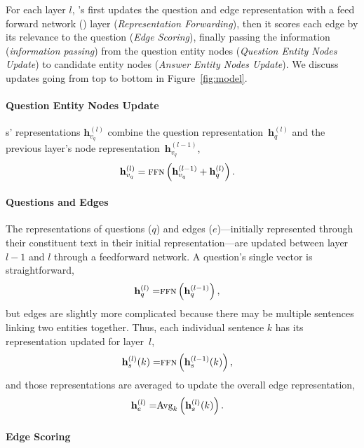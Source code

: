 For each layer $l$, \name{}'s  first updates the question and
edge representation with a feed forward network () layer
(\textit{Representation Forwarding}), then it scores each edge by its
relevance to the question (\textit{Edge Scoring}), finally passing the
information (\textit{information passing}) from the question entity
nodes (\textit{Question Entity Nodes Update}) to candidate entity
nodes (\textit{Answer Entity Nodes Update}).
%
We discuss updates going from top to bottom in Figure~\ref{fig:model}.

\paragraph{Question Entity Nodes Update}

\leftnode{}s' representations $\mathbf{h}_{v_q}^{(l)}$ combine the question representation~$\mathbf{h}_q^{(l)}$ and the previous layer's
node representation~$\mathbf{h}_{v_q}^{(l-1)}$, 
\begin{align}
\mathbf{h}_{v_q}^{(l)} &= \ffn{\mathbf{h}_{v_q}^{(l-1)} + \mathbf{h}_q^{(l)}}.
\end{align}


\paragraph{Questions and Edges}

The representations of questions ($q$) and edges ($e$)---initially
represented through their constituent text in their initial
representation---are updated between layer $l-1$ and $l$ through a
feedforward network.
%
A question's single vector is straightforward,
\begin{align}
  \mathbf{h}_q^{(l)} = & \ffn{\mathbf{h}_q^{(l-1)}},
\end{align}
but edges are slightly more complicated because there may be multiple
sentences linking two entities together.
%
Thus, each individual sentence $k$ has its representation updated for layer~$l$,
\begin{align}
  \mathbf{h}_s^{(l)}{(k)}= & \ffn{\mathbf{h}_s^{(l-1)}{(k)}},
\end{align}
and those representations are averaged to update the overall edge representation,
\begin{align}
    \mathbf{h}_e^{(l)} = & \avg{\mathbf{h}_s^{(l)}{(k)}}{k}.
\end{align}



\paragraph{Edge Scoring}

